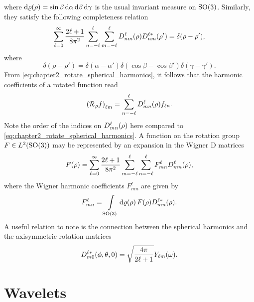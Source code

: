 %
where \(\rotationVolume = \sin{\beta}\dd{\alpha}\dd{\beta}\dd{\gamma}\) is the usual invariant measure on \(\rotationGroup{}\).
Similarly, they satisfy the following completeness relation
%
\begin{equation}
    \sum\limits_{\ell=0}^{\infty} \frac{2\ell+1}{8\pi^{2}} \wignerSum \sum\limits_{m=-\ell}^{\ell} \wigner{\ell}{n}{m}(\rho) \wigner[\ast]{\ell}{n}{m}(\rho')
    = \delta(\rho-\rho'),
\end{equation}
%
where
%
\begin{equation}
    \delta(\rho-\rho')
    = \delta(\alpha-\alpha') \delta(\cos{\beta} - \cos{\beta'}) \delta(\gamma-\gamma').
\end{equation}
%
From \cref{eq:chapter2_rotate_spherical_harmonics}, it follows that the harmonic coefficients of a rotated function read
%
\begin{equation}\label{eq:chapter2_rotation_operator}
    \harmonic{(\rotation{\rho}f)}
    = \wignerSum \wigner{\ell}{m}{n}(\rho) f_{\ell n}.
\end{equation}
%
Note the order of the indices on \(\wigner{\ell}{m}{n}(\rho)\) here compared to \cref{eq:chapter2_rotate_spherical_harmonics}.
A function on the rotation group \(F \in \hilbert{\rotationGroup}\) may be represented by an expansion in the Wigner D matrices
%
\begin{equation}
    F(\rho)
    = \sum\limits_{\ell=0}^{\infty} \frac{2\ell+1}{8\pi^{2}} \sum\limits_{m=-\ell}^{\ell} \wignerSum F^{\ell}_{m n} \wigner{\ell}{m}{n}(\rho),
\end{equation}
%
where the Wigner harmonic coefficients \(F^{\ell}_{m n}\) are given by
%
\begin{equation}
    F^{\ell}_{m n}
    = \integrateRotation{\rho} F(\rho) \wigner[\ast]{\ell}{m}{n}(\rho).
\end{equation}
%
A useful relation to note is the connection between the spherical harmonics and the axisymmetric rotation matrices
%
\begin{equation}\label{eq:chapter2_wigner_axisymmetric}
    \wigner[\ast]{\ell}{m}{0}(\phi,\theta,0)
    = \sqrt{\inverseFactor} \pixel{\harmonic{Y}}.
\end{equation}



\section{Wavelets}\label{sec:chapter2_wavelets}

